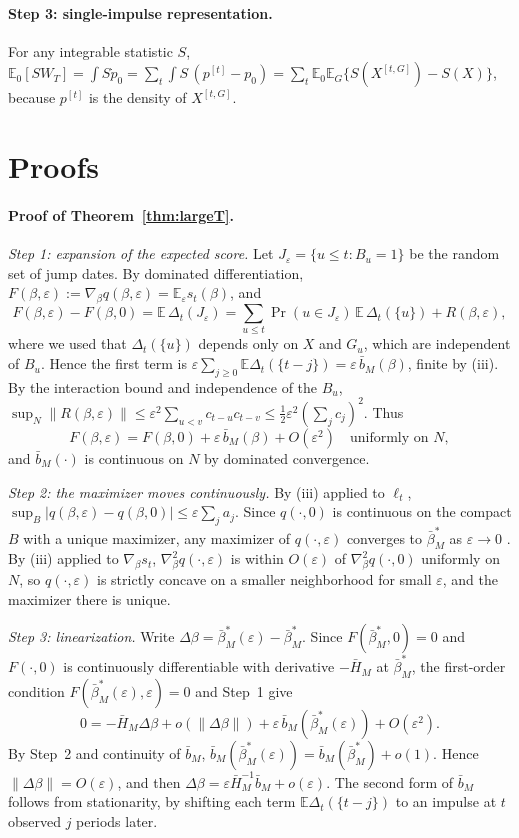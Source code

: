 \documentclass[11pt,a4paper]{article}
\theoremstyle{definition}
\theoremstyle{remark}
\newcommand{\E}{\mathbb{E}}
\begin{document}
\paragraph{Step 3: single-impulse representation.} For any integrable statistic $S$, $\E_0[SW_T]=\int S\dot p_0=\sum_t\int S\,(p^{[t]}-p_0)=\sum_t\E_0\E_G\{S(X^{[t,G]})-S(X)\}$, because $p^{[t]}$ is the density of $X^{[t,G]}$.

\section{Proofs}\label{app:proofs}
\paragraph{Proof of Theorem~\ref{thm:largeT}.}

\emph{Step 1: expansion of the expected score.} Let $J_\varepsilon=\{u\le t:B_u=1\}$ be the random set of jump dates. By dominated differentiation, $F(\beta,\varepsilon):=\nabla_\beta q(\beta,\varepsilon)=\E_\varepsilon s_t(\beta)$, and
\[
F(\beta,\varepsilon)-F(\beta,0)=\E\,\Delta_t(J_\varepsilon)
=\sum_{u\le t}\Pr(u\in J_\varepsilon)\,\E\,\Delta_t(\{u\})+R(\beta,\varepsilon),
\]
where we used that $\Delta_t(\{u\})$ depends only on $X$ and $G_u$, which are independent of $B_u$. Hence the first term is $\varepsilon\sum_{j\ge0}\E\Delta_t(\{t-j\})=\varepsilon\,\bar b_M(\beta)$, finite by (iii). By the interaction bound and independence of the $B_u$, $\sup_N\|R(\beta,\varepsilon)\|\le\varepsilon^2\sum_{u<v}c_{t-u}c_{t-v}\le\tfrac12\varepsilon^2(\sum_jc_j)^2$. Thus
\[
F(\beta,\varepsilon)=F(\beta,0)+\varepsilon\,\bar b_M(\beta)+O(\varepsilon^2)\quad\text{uniformly on }N,
\]
and $\bar b_M(\cdot)$ is continuous on $N$ by dominated convergence.

\emph{Step 2: the maximizer moves continuously.} By (iii) applied to $\ell_t$, $\sup_B|q(\beta,\varepsilon)-q(\beta,0)|\le\varepsilon\sum_ja_j$. Since $q(\cdot,0)$ is continuous on the compact $B$ with a unique maximizer, any maximizer of $q(\cdot,\varepsilon)$ converges to $\bar\beta^*_M$ as $\varepsilon\to0$ \citep[Theorem~2.1]{newey1994}. By (iii) applied to $\nabla_\beta s_t$, $\nabla^2_\beta q(\cdot,\varepsilon)$ is within $O(\varepsilon)$ of $\nabla^2_\beta q(\cdot,0)$ uniformly on $N$, so $q(\cdot,\varepsilon)$ is strictly concave on a smaller neighborhood for small $\varepsilon$, and the maximizer there is unique.

\emph{Step 3: linearization.} Write $\Delta\beta=\bar\beta^*_M(\varepsilon)-\bar\beta^*_M$. Since $F(\bar\beta^*_M,0)=0$ and $F(\cdot,0)$ is continuously differentiable with derivative $-\bar H_M$ at $\bar\beta^*_M$, the first-order condition $F(\bar\beta^*_M(\varepsilon),\varepsilon)=0$ and Step~1 give
\[
0=-\bar H_M\Delta\beta+o(\|\Delta\beta\|)+\varepsilon\,\bar b_M(\bar\beta^*_M(\varepsilon))+O(\varepsilon^2).
\]
By Step~2 and continuity of $\bar b_M$, $\bar b_M(\bar\beta^*_M(\varepsilon))=\bar b_M(\bar\beta^*_M)+o(1)$. Hence $\|\Delta\beta\|=O(\varepsilon)$, and then $\Delta\beta=\varepsilon\bar H_M^{-1}\bar b_M+o(\varepsilon)$. The second form of $\bar b_M$ follows from stationarity, by shifting each term $\E\Delta_t(\{t-j\})$ to an impulse at $t$ observed $j$ periods later.
\end{document}
